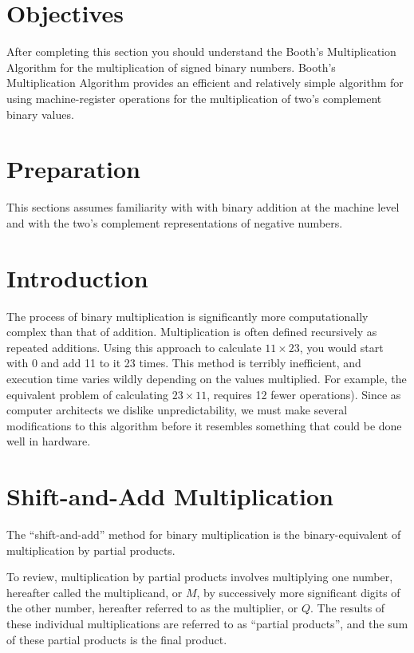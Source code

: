 \documentclass{article}
\begin{document}
\section{Objectives}
After completing this section you should understand the Booth's Multiplication Algorithm for the multiplication of signed binary numbers.
Booth's Multiplication Algorithm provides an efficient and relatively simple algorithm for using machine-register operations for the multiplication of two's complement binary values.

\section{Preparation}
This sections assumes familiarity with with binary addition at the machine level and with the two's complement representations of negative numbers.

\section{Introduction}
The process of binary multiplication is significantly more computationally complex than that of addition.
Multiplication is often defined recursively as repeated additions.
Using this approach to calculate $11 \times 23$, you would start with 0 and add 11 to it 23 times.
This method is terribly inefficient, and execution time varies wildly depending on the values multiplied.
For example, the equivalent problem of calculating $23 \times 11$, requires 12 fewer operations).
Since as computer architects we dislike unpredictability, we must make several modifications to this algorithm before it resembles something that could be done well in hardware.

\section{Shift-and-Add Multiplication}
The ``shift-and-add'' method for binary multiplication is the binary-equivalent of multiplication by partial products.

To review, multiplication by partial products involves multiplying one number, hereafter called the multiplicand, or $M$, by successively more significant digits of the other number, hereafter referred to as the multiplier, or $Q$.
The results of these individual multiplications are referred to as ``partial products'', and the sum of these partial products is the final product.
\end{document}
